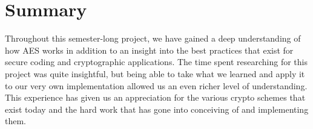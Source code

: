 \documentclass[a4paper,12pt]{article}
\begin{document}
\section{Summary}
Throughout this semester-long project, we have gained a deep understanding of how AES works in addition to an insight into the best practices that exist for secure coding and cryptographic applications. The time spent researching for this project was quite insightful, but being able to take what we learned and apply it to our very own implementation allowed us an even richer level of understanding. This experience has given us an appreciation for the various crypto schemes that exist today and the hard work that has gone into conceiving of and implementing them.
\end{document}
